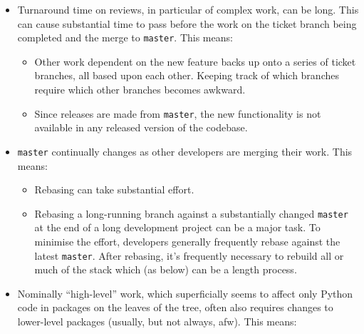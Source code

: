 \documentclass[letterpaper]{scrartcl}
\begin{document}
\begin{itemize}

  \item{Turnaround time on reviews, in particular of complex work, can be
  long.  This can cause substantial time to pass before the work on the ticket
  branch being completed and the merge to \texttt{master}. This means:

    \begin{itemize}

      \item{Other work dependent on the new feature backs up onto a series of
      ticket branches, all based upon each other. Keeping track of which
      branches require which other branches becomes awkward.}

      \item{Since releases are made from \texttt{master}, the new
      functionality is not available in any released version of the codebase.}

    \end{itemize}

  }

  \item{\texttt{master} continually changes as other developers are merging
  their work. This means:

    \begin{itemize}

     \item{Rebasing can take substantial effort.}

      \item{Rebasing a long-running branch against a substantially changed
      \texttt{master} at the end of a long development project can be a major
      task. To minimise the effort, developers generally frequently rebase
      against the latest \texttt{master}. After rebasing, it's frequently
      necessary to rebuild all or much of the stack which (as below) can be a
      length process.}

    \end{itemize}

  }

  \item{Nominally ``high-level'' work, which superficially seems to affect
  only Python code in packages on the leaves of the tree, often also requires
  changes to lower-level packages (usually, but not always, afw). This means:

    \begin{itemize}


\end{itemize}}
\end{itemize}
\end{document}
